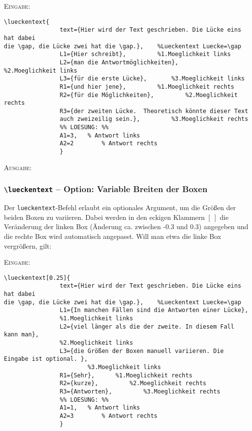 \documentclass[a4paper,12pt]{article}
\begin{document}
\textsc{Eingabe:}
\begin{verbatim}
\lueckentext{
				text={Hier wird der Text geschrieben. Die Lücke eins hat dabei
die \gap, die Lücke zwei hat die \gap.}, 	%Lueckentext Luecke=\gap
				L1={Hier schreibt}, 		%1.Moeglichkeit links  
				L2={man die Antwortmöglichkeiten}, 		%2.Moeglichkeit links
				L3={für die erste Lücke}, 		%3.Moeglichkeit links
				R1={und hier jene}, 		%1.Moeglichkeit rechts 
				R2={für die Möglichkeiten}, 		%2.Moeglichkeit rechts
				R3={der zweiten Lücke.  Theoretisch könnte dieser Text 
				auch zweizeilig sein.}, 		%3.Moeglichkeit rechts
				%% LOESUNG: %%
				A1=3,   % Antwort links
				A2=2		% Antwort rechts
				}			
\end{verbatim}

\textsc{Ausgabe:}


\subsubsection{\texttt{\textbackslash lueckentext} -- Option: Variable Breiten der Boxen}

Der \texttt{lueckentext}-Befehl erlaubt ein optionales Argument, um die Größen der beiden Boxen zu variieren. Dabei werden in den eckigen Klammern $[~]$ die Veränderung der linken Box (Änderung ca. zwischen -0.3 und 0.3) angegeben und die rechte Box wird automatisch angepasst. Will man etwa die linke Box vergrößern, gilt:\leer  

\textsc{Eingabe:}

\begin{verbatim}
\lueckentext[0.25]{
				text={Hier wird der Text geschrieben. Die Lücke eins hat dabei
die \gap, die Lücke zwei hat die \gap.}, 	%Lueckentext Luecke=\gap
				L1={In manchen Fällen sind die Antworten einer Lücke}, 		
				%1.Moeglichkeit links  
				L2={viel länger als die der zweite. In diesem Fall kann man}, 		
				%2.Moeglichkeit links
				L3={die Größen der Boxen manuell variieren. Die Eingabe ist optional. }, 
						%3.Moeglichkeit links
				R1={Sehr}, 		%1.Moeglichkeit rechts 
				R2={kurze}, 		%2.Moeglichkeit rechts
				R3={Antworten}, 		%3.Moeglichkeit rechts
				%% LOESUNG: %%
				A1=1,   % Antwort links
				A2=3		% Antwort rechts 
				}
\end{verbatim}
\end{document}
